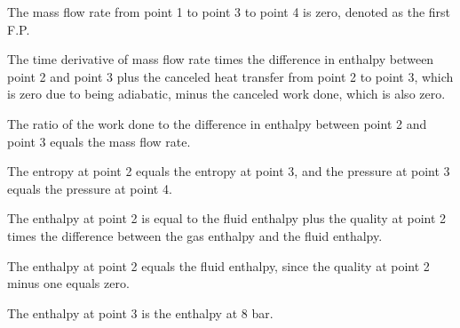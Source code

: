 The mass flow rate from point 1 to point 3 to point 4 is zero, denoted as the first F.P.

The time derivative of mass flow rate times the difference in enthalpy between point 2 and point 3 plus the canceled heat transfer from point 2 to point 3, which is zero due to being adiabatic, minus the canceled work done, which is also zero.

The ratio of the work done to the difference in enthalpy between point 2 and point 3 equals the mass flow rate.

The entropy at point 2 equals the entropy at point 3, and the pressure at point 3 equals the pressure at point 4.

The enthalpy at point 2 is equal to the fluid enthalpy plus the quality at point 2 times the difference between the gas enthalpy and the fluid enthalpy.

The enthalpy at point 2 equals the fluid enthalpy, since the quality at point 2 minus one equals zero.

The enthalpy at point 3 is the enthalpy at 8 bar.